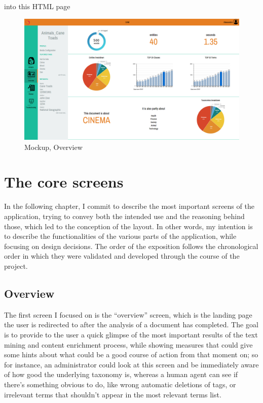 \documentclass[12pt,oneside,svgnames]{memoir}
\begin{document}
into this HTML page

\begin{figure}[htbp]
\centering
\includegraphics{./src/img/mockup-overview.png}
\caption{Mockup, Overview}
\end{figure}

\chapter{The core screens}\label{the-core-screens}

In the following chapter, I commit to describe the most important
screens of the application, trying to convey both the intended use and
the reasoning behind those, which led to the conception of the layout.
In other words, my intention is to describe the functionalities of the
various parts of the application, while focusing on design decisions.
The order of the exposition follows the chronological order in which
they were validated and developed through the course of the project.

\section{Overview}\label{overview-1}

The first screen I focused on is the ``overview'' screen, which is the
landing page the user is redirected to after the analysis of a document
has completed. The goal is to provide to the user a quick glimpse of the
most important results of the text mining and content enrichment
process, while showing measures that could give some hints about what
could be a good course of action from that moment on; so for instance,
an administrator could look at this screen and be immediately aware of
how good the underlying taxonomy is, whereas a human agent can see if
there's something obvious to do, like wrong automatic deletions of tags,
or irrelevant terms that shouldn't appear in the most relevant terms
list.
\end{document}
